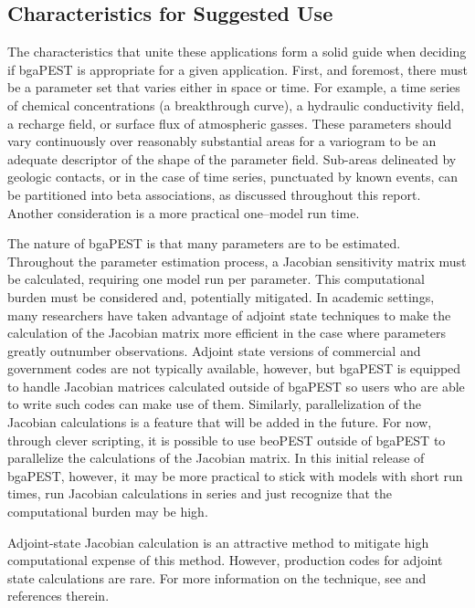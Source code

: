 \documentclass[11pt,oneside,onecolumn]{usgsreport}
\begin{document}
\begin{multicols}{2}
\begin{bibunit}
\subsection{Characteristics for Suggested Use}

The characteristics that unite these applications form a solid guide
when deciding if bgaPEST is appropriate for a given application. First,
and foremost, there must be a parameter set that varies either in
space or time. For example, a time series of chemical concentrations
(a breakthrough curve), a hydraulic conductivity field, a recharge
field, or surface flux of atmospheric gasses. These parameters should
vary continuously over reasonably substantial areas for a variogram
to be an adequate descriptor of the shape of the parameter field.
Sub-areas delineated by geologic contacts, or in the case of time
series, punctuated by known events, can be partitioned into beta associations,
as discussed throughout this report. Another consideration is a more
practical one--model run time. 

The nature of bgaPEST is that many parameters are to be estimated.
Throughout the parameter estimation process, a Jacobian sensitivity
matrix must be calculated, requiring one model run per parameter.
This computational burden must be considered and, potentially mitigated.
In academic settings, many researchers have taken advantage of adjoint
state techniques to make the calculation of the Jacobian matrix more
efficient in the case where parameters greatly outnumber observations.
Adjoint state versions of commercial and government codes are not
typically available, however, but bgaPEST is equipped to handle Jacobian
matrices calculated outside of bgaPEST so users who are able to write
such codes can make use of them. Similarly, parallelization of the
Jacobian calculations is a feature that will be added in the future.
For now, through clever scripting, it is possible to use beoPEST outside
of bgaPEST to parallelize the calculations of the Jacobian matrix.
In this initial release of bgaPEST, however, it may be more practical
to stick with models with short run times, run Jacobian calculations
in series and just recognize that the computational burden may be
high. 

Adjoint-state Jacobian calculation is an attractive method to mitigate
high computational expense of this method. However, production codes
for adjoint state calculations are rare. For more information on the
technique, see \citep{TownleyWilson1985,Sykes1985,SamperNeuman1986,RamaRao1995,neupauerWilson1999}
and references therein.


\end{bibunit}
\end{multicols}
\end{document}
